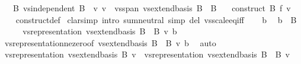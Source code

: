 \begin{isabellebody}
\ \ \ B{\isacharcolon}{\kern0pt}\ {\isachardoublequoteopen}vs{}{\isachardot}{\kern0pt}independent\ B{\isachardoublequoteclose}\ \ v{\isacharcolon}{\kern0pt}\ {\isachardoublequoteopen}v\ {\isasymin}\ vs{}{\isachardot}{\kern0pt}span\ {\isacharparenleft}{\kern0pt}vs{}{\isachardot}{\kern0pt}extend{\isacharunderscore}{\kern0pt}basis\ B\ {\isacharminus}{\kern0pt}\ B{\isacharparenright}{\kern0pt}{\isachardoublequoteclose}\isanewline
\ \ \ {\isachardoublequoteopen}construct\ B\ f\ v\ {\isacharequal}{\kern0pt}\ {}{\isachardoublequoteclose}\isanewline
%
\isadelimproof
\ \ %
\endisadelimproof
%
\isatagproof
{}\isamarkupfalse%
\ construct{\isacharunderscore}{\kern0pt}def\isanewline
{}\isamarkupfalse%
\ {\isacharparenleft}{\kern0pt}clarsimp\ intro{\isacharbang}{\kern0pt}{\isacharcolon}{\kern0pt}\ sum{\isachardot}{\kern0pt}neutral\ simp\ del{\isacharcolon}{\kern0pt}\ vs{}{\isachardot}{\kern0pt}scale{\isacharunderscore}{\kern0pt}eq{\isacharunderscore}{\kern0pt}{}{\isacharunderscore}{\kern0pt}iff{\isacharparenright}{\kern0pt}\isanewline
\ \ \isamarkupfalse%
\ b\ \isamarkupfalse%
\ {\isachardoublequoteopen}b\ {\isasymin}\ B{\isachardoublequoteclose}\isanewline
\ \ \isamarkupfalse%
\ \isamarkupfalse%
\ {\isachardoublequoteopen}vs{}{\isachardot}{\kern0pt}representation\ {\isacharparenleft}{\kern0pt}vs{}{\isachardot}{\kern0pt}extend{\isacharunderscore}{\kern0pt}basis\ B\ {\isacharminus}{\kern0pt}\ B{\isacharparenright}{\kern0pt}\ v\ b\ {\isacharequal}{\kern0pt}\ {}{\isachardoublequoteclose}\isanewline
\ \ \ \ \isamarkupfalse%
\ vs{}{\isachardot}{\kern0pt}representation{\isacharunderscore}{\kern0pt}ne{\isacharunderscore}{\kern0pt}zero{\isacharbrackleft}{\kern0pt}of\ {\isachardoublequoteopen}vs{}{\isachardot}{\kern0pt}extend{\isacharunderscore}{\kern0pt}basis\ B\ {\isacharminus}{\kern0pt}\ B{\isachardoublequoteclose}\ v\ b{\isacharbrackright}{\kern0pt}\ \isamarkupfalse%
\ auto\isanewline
\ \ \isamarkupfalse%
\ \isamarkupfalse%
\ {\isachardoublequoteopen}vs{}{\isachardot}{\kern0pt}representation\ {\isacharparenleft}{\kern0pt}vs{}{\isachardot}{\kern0pt}extend{\isacharunderscore}{\kern0pt}basis\ B{\isacharparenright}{\kern0pt}\ v\ {\isacharequal}{\kern0pt}\ vs{}{\isachardot}{\kern0pt}representation\ {\isacharparenleft}{\kern0pt}vs{}{\isachardot}{\kern0pt}extend{\isacharunderscore}{\kern0pt}basis\ B\ {\isacharminus}{\kern0pt}\ B{\isacharparenright}{\kern0pt}\ v{\isachardoublequoteclose}\isanewline

\end{isabellebody}
